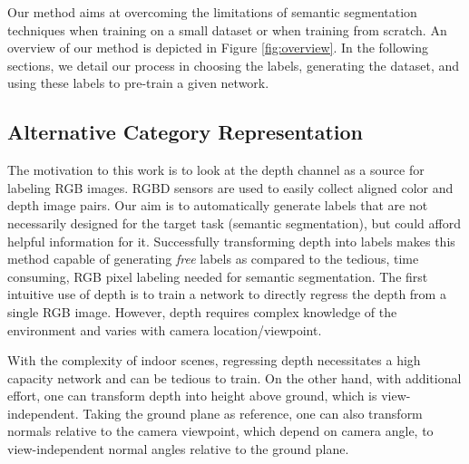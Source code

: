 Our method aims at overcoming the limitations of semantic segmentation techniques when training on a small dataset or when training from scratch. An overview of our method is depicted in Figure  \ref{fig:overview}. In the following sections, we detail our process in choosing the labels, generating the dataset, and using these labels to pre-train a given network.

\subsection{Alternative Category Representation}\label{sec:label_choice}
The motivation to this work is to look at the depth channel as a source for labeling RGB images. RGBD sensors are used to easily collect aligned color and depth image pairs. Our aim is to automatically generate labels that are not necessarily designed for the target task (semantic segmentation), but could afford helpful information for it. Successfully transforming depth into labels makes this method capable of generating \emph{free} labels as compared to the tedious, time consuming, RGB pixel labeling needed for semantic segmentation. The first intuitive use of depth is to train a network to directly regress the depth from a single RGB image. However, depth requires complex knowledge of the environment and varies with camera location/viewpoint.

With the complexity of indoor scenes, regressing depth necessitates a high capacity network and can be tedious to train. On the other hand, with additional effort, one can transform depth into height above ground, which is view-independent. Taking the ground plane as reference, one can also transform normals relative to the camera viewpoint, which depend on camera angle, to view-independent normal angles relative to the ground plane.

